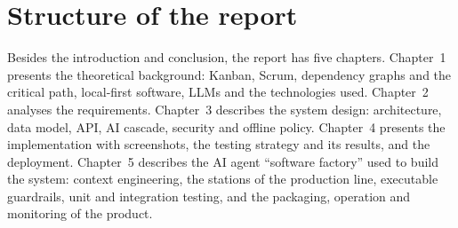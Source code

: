 \documentclass[../main.tex]{subfiles}
\begin{document}
\section{Structure of the report}
Besides the introduction and conclusion, the report has five chapters. Chapter~1 presents the
theoretical background: Kanban, Scrum, dependency graphs and the critical path, local-first
software, LLMs and the technologies used. Chapter~2 analyses the requirements. Chapter~3 describes
the system design: architecture, data model, API, AI cascade, security and offline policy.
Chapter~4 presents the implementation with screenshots, the testing strategy and its results, and
the deployment. Chapter~5 describes the AI agent ``software factory'' used to build the system:
context engineering, the stations of the production line, executable guardrails, unit and
integration testing, and the packaging, operation and monitoring of the product.
\end{document}
